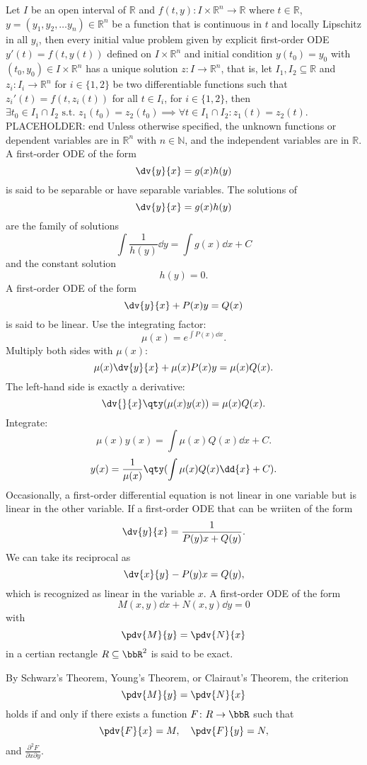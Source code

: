 \documentclass[a4paper,12pt]{report}
\begin{document}
Let $I$ be an open interval of $\mathbb{R}$ and $f(t,y)\colon I\times\mathbb{R}^n\to\mathbb{R}$ where $t\in\mathbb{R}$, $y=(y_1, y_2,\dots  y_n)\in\mathbb{R}^n$ be a function that is continuous in $t$ and locally Lipschitz in all $y_i$, then every initial value problem given by explicit first-order ODE $y'(t)=f\left(t,y(t)\right)$ defined on $I\times\mathbb{R}^n$ and initial condition $y\left(t_{0}\right)=y_{0}$ with $(t_{0},y_{0})\in I\times\mathbb{R}^n$ has a unique solution $z\colon I\to\mathbb {R}^n$, that is, let $I_1,I_2\subseteq\mathbb{R}$ and $z_i\colon I_i\to\mathbb{R}^n$ for $i\in\{1,2\}$ be two differentiable functions such that $z_i'(t)=f\left(t,z_i(t)\right)$ for all $t\in I_i$, for $i\in\{1,2\}$, then $\exists t_0\in I_1\cap I_2\text{\ s.t.\ }z_1(t_0)=z_2(t_0)\implies\forall t\in I_1\cap I_2\colon z_1(t)=z_2(t)$.
PLACEHOLDER: end
Unless otherwise specified, the unknown functions or dependent variables are in $\mathbb{R}^n$ with $n\in\mathbb{N}$, and the independent variables are in $\mathbb{R}$.
A first-order ODE of the form
\[\dv{y}{x}=g(x)h(y)\]
is said to be separable or have separable variables.
The solutions of
\[\dv{y}{x}=g(x)h(y)\]
are the family of solutions
\[\int\frac{1}{h(y)}\dd{y}=\int g(x)\dd{x}+C\]
and the constant solution
\[h(y)=0.\]
A first-order ODE of the form
\[\dv{y}{x}+P(x)y=Q(x)\]
is said to be linear.
Use the integrating factor:
\[\mu(x)=e^{\int P(x)\dd{x}}.\]
Multiply both sides with $\mu(x)$:
\[\mu(x)\dv{y}{x}+\mu(x)P(x)y=\mu(x)Q(x).\]
The left-hand side is exactly a derivative:
\[\dv{}{x}\qty(\mu(x)y(x))=\mu(x)Q(x).\]
Integrate:
\[\mu(x)y(x)=\int\mu(x)Q(x)\dd{x}+C.\]
\[y(x)=\frac{1}{\mu(x)}\qty(\int\mu(x)Q(x)\dd{x}+C).\]
Occasionally, a first-order differential equation is not linear in one variable
but is linear in the other variable. If a first-order ODE that can be wriiten of the form
\[\dv{y}{x}=\frac{1}{P(y)x+Q(y)}.\]
We can take its reciprocal as
\[\dv{x}{y}-P(y)x=Q(y),\]
which is recognized as linear in the variable $x$.
A first-order ODE of the form
\[M(x,y)\dd{x}+N(x,y)\dd{y}=0\]
with
\[\pdv{M}{y}=\pdv{N}{x}\]
in a certian rectangle $R\subseteq\bbR^2$ is said to be exact.

By Schwarz's Theorem, Young's Theorem, or Clairaut's Theorem, the criterion
\[\pdv{M}{y}=\pdv{N}{x}\]
holds if and only if there exists a function $F\colon R\to\bbR$ such that
\[\pdv{F}{x}=M,\quad\pdv{F}{y}=N,\]
and $\frac{\partial^2F}{\partial x\partial y}$.
\end{document}
